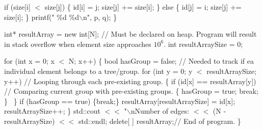 \documentclass[]{article}
\begin{document}
\indent\indent if (size[i] $<$ size[j])\newline
\indent\indent \{\newline
\indent\indent\indent id[i] = j;\newline
\indent\indent\indent size[j] += size[i];\newline
\indent\indent \} else \{\newline
\indent\indent\indent id[j] = i;\newline
\indent\indent\indent size[j] += size[i];\newline
\indent\indent \}\newline\newline
\indent\indent printf(" \%d \%d$\backslash$n", p, q);\newline
\indent \}\newline

int* resultArray = new int[N]; // Must be declared on heap. Program will result in stack overflow when element size approaches $10^6$.\newline\newline
\indent int resultArraySize = 0;\newline

for (int x = 0; x $<$ N; x++)\newline
\indent \{\newline
\indent\indent bool hasGroup = false; // Needed to track if ea individual element belongs to a tree/group.\newline\newline
\indent\indent for (int y = 0; y $<$ resultArraySize; y++) // Looping through each pre-existing group.\newline
\indent\indent \{\newline
\indent\indent\indent if (id[x] == resultArray[y]) // Comparing current group with pre-existing groups.\newline
\indent\indent\indent \{\newline
\indent\indent\indent\indent hasGroup = true;\newline
\indent\indent\indent\indent break;\newline
\indent\indent\indent \}\newline
\indent\indent\ \}\newline\newline
\indent\indent if (hasGroup == true) \{break;\}\newline\newline
\indent\indent resultArray[resultArraySize] = id[x];\newline
\indent\indent resultArraySize++;\newline
\indent \}\newline\newline
\indent std::cout $<<$ "$\backslash$nNumber of edges: $<<$ (N - resultArraySize) $<<$ std::endl;\newline
\indent delete[ ] resultArray;\newline // End of program.\newline
\noindent \}
\end{document}
